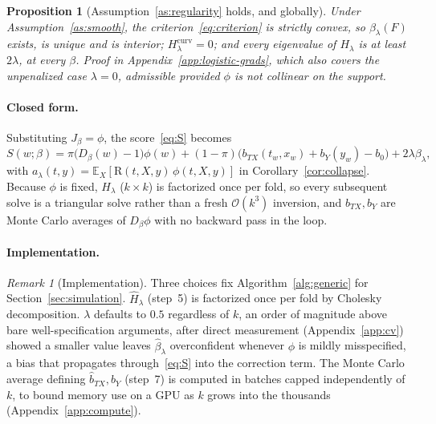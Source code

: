\documentclass[11pt]{article}
\theoremstyle{plain}
\newtheorem{mypropo}{Proposition}
\theoremstyle{definition}
\theoremstyle{remark}
\newtheorem{remark}{Remark}
\newcommand{\pE}{\ensuremath{\mathbb{E}}}
\newcommand{\ratio}{\ensuremath{\pi}}
\newcommand{\DensityRatio}{\text{R}}
\newcommand{\betahat}{\widehat{\beta}}
\newcommand{\ks}{k}
\newcommand{\cO}{\mathcal{O}}
\newcommand{\score}{S}
\begin{document}
\begin{mypropo}[Assumption~\ref{as:regularity} holds, and globally]
\label{prop:logistic-regularity}
Under Assumption~\ref{as:smooth}, the criterion~\eqref{eq:criterion} is strictly convex, so
$\beta_\lambda(F)$ exists, is unique and is interior; $H_\lambda^{\mathrm{curv}} = 0$; and every
eigenvalue of $H_\lambda$ is at least $2\lambda$, at every $\beta$. Proof in
Appendix~\ref{app:logistic-grads}, which also covers the unpenalized case $\lambda=0$,
admissible provided $\phi$ is not collinear on the support.
\end{mypropo}

\paragraph{Closed form.}
\label{sec:mcd-logistic-closed-form}
Substituting $J_\beta=\phi$, the score~\eqref{eq:S} becomes
\begin{equation}
\score(w;\beta)
= \ratio\big( D_\beta(w) - 1 \big)\phi(w)
+ (1-\ratio)\Big( b_{TX}(t_w,x_w) + b_Y(y_w) - b_0 \Big)
+ 2\lambda\beta_\lambda ,
\label{eq:S-logistic}
\end{equation}
with $a_\lambda(t,y) = \pE_X[\DensityRatio(t,X,y)\,\phi(t,X,y)]$ in Corollary~\ref{cor:collapse}.
Because $\phi$ is fixed, $H_\lambda$ ($\ks\times\ks$) is factorized once per fold, so every
subsequent solve is a triangular solve rather than a fresh $\cO(\ks^3)$ inversion, and
$b_{TX},b_Y$ are Monte Carlo averages of $D_\beta\phi$ with no backward pass in the loop.

\paragraph{Implementation.}
\label{sec:mcd-algorithm-logistic}
\begin{remark}[Implementation]
\label{rem:impl-logistic}
Three choices fix Algorithm~\ref{alg:generic} for Section~\ref{sec:simulation}.
$\widehat H_\lambda$ (step~5) is factorized once per fold by Cholesky decomposition. $\lambda$
defaults to $0.5$ regardless of $\ks$, an order of magnitude above bare well-specification
arguments, after direct measurement (Appendix~\ref{app:cv}) showed a smaller value leaves
$\betahat_\lambda$ overconfident whenever $\phi$ is mildly misspecified, a bias that
propagates through~\eqref{eq:S} into the correction term. The Monte Carlo average defining
$\widehat b_{TX},\widehat b_Y$ (step~7) is computed in batches capped independently of $\ks$, to
bound memory use on a GPU as $\ks$ grows into the thousands (Appendix~\ref{app:compute}).
\end{remark}
\end{document}
